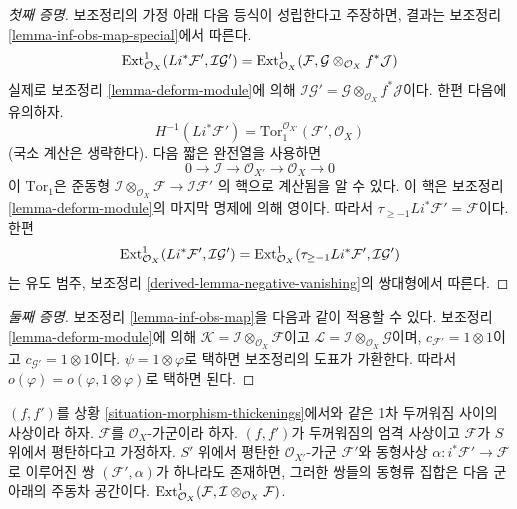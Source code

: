\begin{proof}[첫째 증명]
보조정리의 가정 아래 다음 등식이 성립한다고 주장하면, 결과는
보조정리 \ref{lemma-inf-obs-map-special}에서 따른다.
$$
\mathop{\mathrm{Ext}}\nolimits^1_{\mathcal{O}_X}(Li^*\mathcal{F}',
\mathcal{I}\mathcal{G}') =
\mathop{\mathrm{Ext}}\nolimits^1_{\mathcal{O}_X}(\mathcal{F},
\mathcal{G} \otimes_{\mathcal{O}_X} f^*\mathcal{J})
$$
실제로 보조정리 \ref{lemma-deform-module}에 의해
$\mathcal{I}\mathcal{G}' =
\mathcal{G} \otimes_{\mathcal{O}_X} f^*\mathcal{J}$이다. 한편
다음에 유의하자.
$$
H^{-1}(Li^*\mathcal{F}') =
\text{Tor}_1^{\mathcal{O}_{X'}}(\mathcal{F}', \mathcal{O}_X)
$$
(국소 계산은 생략한다). 다음 짧은 완전열을 사용하면
$$
0 \to \mathcal{I} \to \mathcal{O}_{X'} \to \mathcal{O}_X \to 0
$$
이 $\text{Tor}_1$은 준동형
$\mathcal{I} \otimes_{\mathcal{O}_X} \mathcal{F} \to \mathcal{I}\mathcal{F}'$
의 핵으로 계산됨을 알 수 있다. 이 핵은 보조정리
\ref{lemma-deform-module}의 마지막 명제에 의해 영이다. 따라서
$\tau_{\geq -1}Li^*\mathcal{F}' = \mathcal{F}$이다. 한편
$$
\mathop{\mathrm{Ext}}\nolimits^1_{\mathcal{O}_X}(Li^*\mathcal{F}',
\mathcal{I}\mathcal{G}') =
\mathop{\mathrm{Ext}}\nolimits^1_{\mathcal{O}_X}(\tau_{\geq -1}Li^*\mathcal{F}',
\mathcal{I}\mathcal{G}')
$$
는 유도 범주, 보조정리
\ref{derived-lemma-negative-vanishing}의 쌍대형에서 따른다.
\end{proof}

\begin{proof}[둘째 증명]
보조정리 \ref{lemma-inf-obs-map}을 다음과 같이 적용할 수 있다.
보조정리 \ref{lemma-deform-module}에 의해
$\mathcal{K} = \mathcal{I} \otimes_{\mathcal{O}_X} \mathcal{F}$이고
$\mathcal{L} = \mathcal{I} \otimes_{\mathcal{O}_X} \mathcal{G}$이며,
$c_{\mathcal{F}'} = 1 \otimes 1$이고 $c_{\mathcal{G}'} = 1 \otimes 1$이다.
$\psi = 1 \otimes \varphi$로 택하면 보조정리의 도표가 가환한다.
따라서 $o(\varphi) = o(\varphi, 1 \otimes \varphi)$로 택하면 된다.
\end{proof}

\begin{lemma}
\label{lemma-inf-ext-rel}
$(f, f')$를 상황 \ref{situation-morphism-thickenings}에서와 같은
1차 두꺼워짐 사이의 사상이라 하자. $\mathcal{F}$를
$\mathcal{O}_X$-가군이라 하자. $(f, f')$가 두꺼워짐의 엄격 사상이고
$\mathcal{F}$가 $S$ 위에서 평탄하다고 가정하자.
$S'$ 위에서 평탄한 $\mathcal{O}_{X'}$-가군 $\mathcal{F}'$와 동형사상
$\alpha : i^*\mathcal{F}' \to \mathcal{F}$로 이루어진 쌍
$(\mathcal{F}', \alpha)$가 하나라도 존재하면, 그러한 쌍들의 동형류
집합은 다음 군 아래의 주동차 공간이다.
$\mathop{\mathrm{Ext}}\nolimits^1_{\mathcal{O}_X}(
\mathcal{F}, \mathcal{I} \otimes_{\mathcal{O}_X} \mathcal{F})$.
\end{lemma}

